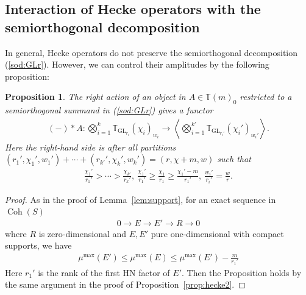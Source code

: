 \documentclass [11pt,oneside,a4paper,mathscr]{amsart}
\newtheorem{prop}[thm]{Proposition}
\theoremstyle{definition}
\renewcommand{\leq}{\leqslant}
\renewcommand{\geq}{\geqslant}
\newcommand{\Coh}{\operatorname{Coh}}
\newcommand{\GL}{\operatorname{GL}}
\begin{document}
\subsection{Interaction of Hecke operators with the semiorthogonal decomposition}
In general, Hecke operators do not preserve the semiorthogonal decomposition (\ref{sod:GLr}). 
However, we can control their amplitudes by the following proposition: 
\begin{prop}\label{prop:Hecke:sod}
The right action of an object in $A\in \mathbb{T}(m)_0$ restricted to a semiorthogonal summand
in (\ref{sod:GLr}) gives a functor
    \begin{align*}
    (-)\ast A \colon 
\bigotimes_{i=1}^k \mathbb{T}_{\GL_{r_i}}(\chi_i)_{w_i} 
\to \left\langle \bigotimes_{i=1}^{k'} \mathbb{T}_{\GL_{r_i'}}(\chi_i')_{w_i'}\right\rangle.
    \end{align*}
    Here the right-hand side is after all partitions 
    $(r_1', \chi_1', w_1')+\cdots+(r_{k'}', \chi_k', w_k')=(r, \chi+m, w)$ such that 
    \begin{align*}
        \frac{\chi_1'}{r_1'}>\cdots>\frac{\chi_{k'}}{r_k'}, \
        \frac{\chi_1'}{r_1'}\geq \frac{\chi_1}{r_1}\geq\frac{\chi_1'-m}{r_1'}, \
        \frac{w_i'}{r_i'}=\frac{w}{r}.
    \end{align*}
\end{prop}
\begin{proof}
    As in the proof of Lemma~\ref{lem:support}, for an exact sequence in $\Coh(S)$
    \begin{align*}
        0\to E\to E'\to R \to 0
    \end{align*}
    where $R$ is zero-dimensional and $E, E'$ pure one-dimensional with compact supports, 
    we have 
    \begin{align*}
        \mu^{\mathrm{max}}(E') \leq \mu^{\mathrm{max}}(E) \leq \mu^{\mathrm{max}}(E')-\frac{m}{r_1'}
    \end{align*}
    Here $r_1'$ is the rank of the first HN factor of $E'$. Then the Proposition holds 
    by the same argument in the proof of Proposition~\ref{prop:hecke2}.
\end{proof}
\end{document}
